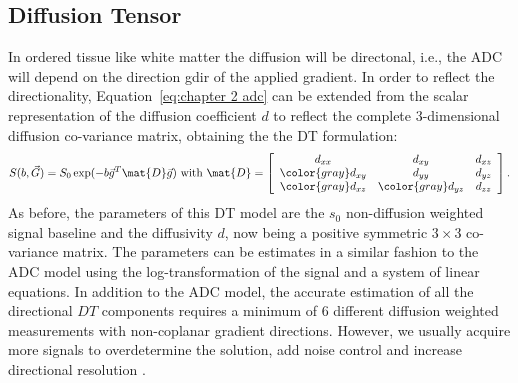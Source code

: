 \subsection{Diffusion Tensor}
\label{subsec:dti}
In ordered tissue like white matter the diffusion will be directonal, i.e., the \gls{ADC} will depend on the direction {\gls{gdir}} of the applied gradient. In order to reflect the directionality, Equation~\ref{eq:chapter 2 adc} can be extended from the scalar representation of the diffusion coefficient $d$ to reflect the complete 3-dimensional diffusion co-variance matrix\citep{Basser:1994}, obtaining the the {\gls{DT}} formulation:
\begin{equation}
	S(b,\vec{G}) = S_{0}\exp(-b\vec{g}^T \mat{D}\vec{g}) \mbox{ with } \mat{D} = 
	\left[
	\begin{array}{ccc}
	d_{xx} & d_{xy} & d_{xz} \\
	{\color{gray} d_{xy}} & d_{yy} & d_{yz} \\
	{\color{gray} d_{xz}} & {\color{gray} d_{yz}} & d_{zz} 	
	\end{array} \right].	
    \label{eq:dti}
\end{equation}
As before, the parameters of this {\gls{DT}} model are the $s_0$ non-diffusion weighted signal baseline and the diffusivity $d$, now being a positive symmetric $3\times3$ co-variance matrix. The parameters can be estimates in a similar fashion to the ADC model using the log-transformation of the signal and a system of linear equations. In addition to the ADC model, the accurate estimation of all the directional $DT$ components requires a minimum of 6 different diffusion weighted measurements with non-coplanar gradient directions. However, we usually acquire more signals to overdetermine the solution, add noise control and increase directional resolution \citep{Jones:2004a}.



